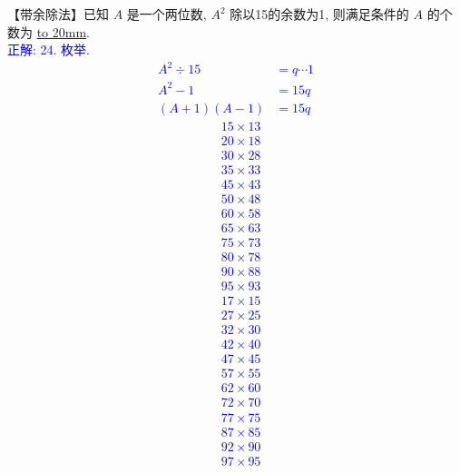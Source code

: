 \item {
    【带余除法】已知 $A$ 是一个两位数, $A^2$ 除以15的余数为1, 则满足条件的 $A$ 的个数为 \underline{\hbox to 20mm{}}.
    \ifshowSolution
        \\\fangsong{}\textcolor{blue}{
            正解: 24. 枚举.\\
            \begin{align*}
                A^2\div 15 &= q\cdots 1\\
                A^2 - 1 &= 15q\\
                (A+1)(A-1) &= 15q
            \end{align*}
            \setcounter{equation}{0}
            \begin{align}
                &15\times 13\\
                &20\times 18\\
                &30\times 28\\
                &35\times 33\\
                &45\times 43\\
                &50\times 48\\
                &60\times 58\\
                &65\times 63\\
                &75\times 73\\
                &80\times 78\\
                &90\times 88\\
                &95\times 93\\
                &17\times 15\\
                &27\times 25\\
                &32\times 30\\
                &42\times 40\\
                &47\times 45\\
                &57\times 55\\
                &62\times 60\\
                &72\times 70\\
                &77\times 75\\
                &87\times 85\\
                &92\times 90\\
                &97\times 95
            \end{align}
        }
    \else
        \vspace{1cm}
    \fi
}

